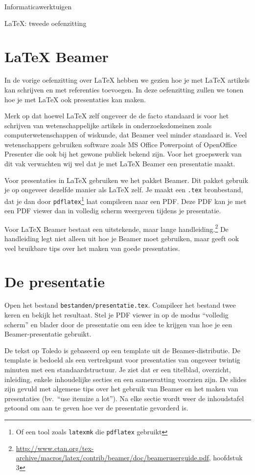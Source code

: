 \documentclass[a4paper,12pt]{article}
\begin{document}
\begin{center}
  \huge Informaticawerktuigen

  \Huge \LaTeX{}: tweede oefenzitting
\end{center}

\section{\LaTeX{} Beamer}
In de vorige oefenzitting over \LaTeX{} hebben we gezien hoe je met
\LaTeX{} artikels kan schrijven en met \BibTeX{} referenties toevoegen.
In deze oefenzitting zullen we tonen hoe je met \LaTeX{} ook
presentaties kan maken.

Merk op dat hoewel \LaTeX{} zelf ongeveer de de facto standaard is
voor het schrijven van wetenschappelijke artikels in
onderzoeksdomeinen zoals computerwetenschappen of wiskunde, dat Beamer
veel minder standaard is. Veel wetenschappers gebruiken software zoals
MS Office Powerpoint of OpenOffice Presenter die ook bij het gewone
publiek bekend zijn. Voor het groepswerk van dit vak verwachten wij wel
dat je met \LaTeX{} Beamer een presentatie maakt.

Voor presentaties in \LaTeX{} gebruiken we het pakket Beamer. Dit
pakket gebruik je op ongeveer dezelfde manier als \LaTeX{} zelf. Je
maakt een \texttt{.tex} bronbestand, dat je dan door
\texttt{pdflatex}\footnote{Of een tool zoals \texttt{latexmk} die
  \texttt{pdflatex} gebruikt} laat compileren
naar een PDF\@. Deze PDF kan je met een PDF viewer dan in volledig scherm
weergeven tijdens je presentatie.

Voor \LaTeX{} Beamer bestaat een uitstekende, maar lange
handleiding.\footnote{\url{http://www.ctan.org/tex-archive/macros/latex/contrib/beamer/doc/beameruserguide.pdf},
  hoofdstuk 3}
De handleiding legt niet alleen uit hoe je Beamer moet gebruiken, maar
geeft ook veel bruikbare tips over het maken van goede presentaties.

\section{De presentatie}
Open het bestand \texttt{bestanden/presentatie.tex}. Compileer het
bestand twee keren en bekijk het resultaat. Stel je PDF viewer in op
de modus ``volledig scherm'' en blader door de presentatie om een idee
te krijgen van hoe je een Beamer-presentatie gebruikt.

De tekst op Toledo is gebaseerd op een template uit de
Beamer-distributie. De template is bedoeld als een vertrekpunt voor
presentaties van ongeveer twintig minuten met een standaardstructuur.
Je ziet dat er een titelblad, overzicht, inleiding, enkele
inhoudelijke secties en een samenvatting voorzien zijn. De slides zijn
gevuld met algemene tips over het gebruik van Beamer en het maken van
presentaties (bv.\ ``use itemize a lot''). Na elke sectie wordt weer de
inhoudstafel getoond om aan te geven hoe ver de presentatie gevorderd
is.
\end{document}
